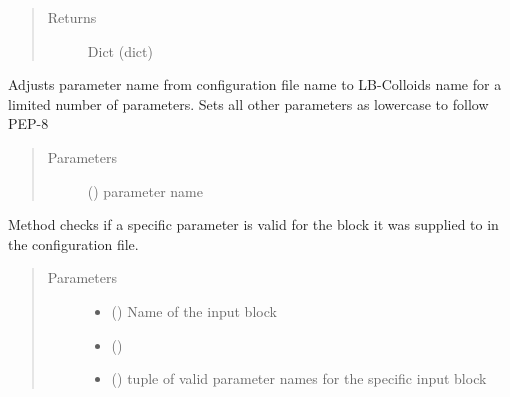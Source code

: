 \documentclass[letterpaper,10pt,english]{sphinxmanual}
\begin{document}
\begin{fulllineitems}
\begin{fulllineitems}
\begin{quote}
\begin{description}
\item[{Returns}] \leavevmode
Dict (dict)

\end{description}\end{quote}

\end{fulllineitems}


\begin{fulllineitems}
\label{\detokenize{index:lb_colloids.Colloids.Colloid_IO.Config.adjust_pname}}
Adjusts parameter name from configuration file name to LB-Colloids name for a limited number of
parameters. Sets all other parameters as lowercase to follow PEP-8
\begin{quote}\begin{description}
\item[{Parameters}] \leavevmode
{} () \textendash{} parameter name

\end{description}\end{quote}

\end{fulllineitems}


\begin{fulllineitems}
\label{\detokenize{index:lb_colloids.Colloids.Colloid_IO.Config.check_if_valid}}
Method checks if a specific parameter is valid for the block it was supplied to
in the configuration file.
\begin{quote}\begin{description}
\item[{Parameters}] \leavevmode\begin{itemize}
\item {} 
 () \textendash{} Name of the input block

\item {} 
 () \textendash{} 

\item {} 
 () \textendash{} tuple of valid parameter names for the specific input block


\end{itemize}
\end{description}
\end{quote}
\end{fulllineitems}
\end{fulllineitems}
\end{document}
